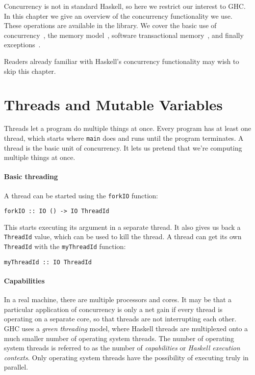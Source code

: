 Concurrency is not in standard Haskell, so here we restrict our
interest to GHC\@.  In this chapter we give an overview of the
concurrency functionality we use.  These operations are available in
the  library.  We cover the basic use of
concurrency~, the memory
model~, software transactional
memory~, and finally
exceptions~.

Readers already familiar with Haskell's concurrency functionality may wish to
skip this chapter.

\section{Threads and Mutable Variables}
\label{sec:concurrent_haskell-threads}

Threads let a program do multiple things at once.  Every program has at least
one thread, which starts where \verb|main| does and runs until the program
terminates.  A thread is the basic unit of concurrency.  It lets us pretend that
we're computing multiple things at once.

\paragraph{Basic threading}
A thread can be started using the \verb|forkIO| function:

\begin{verbatim}
forkIO :: IO () -> IO ThreadId
\end{verbatim}

This starts executing its argument in a separate thread.  It also gives us back
a \verb|ThreadId| value, which can be used to kill the thread.  A thread can get
its own \verb|ThreadId| with the \verb|myThreadId| function:

\begin{verbatim}
myThreadId :: IO ThreadId
\end{verbatim}

\paragraph{Capabilities}
In a real machine, there are multiple processors and cores.  It may be that a
particular application of concurrency is only a net gain if every thread is
operating on a separate core, so that threads are not interrupting each other.
GHC uses a \emph{green threading} model, where Haskell threads are multiplexed
onto a much smaller number of operating system threads.  The number of operating
system threads is referred to as the number of \emph{capabilities} or
\emph{Haskell execution contexts}.  Only operating system threads have the
possibility of executing truly in parallel.


